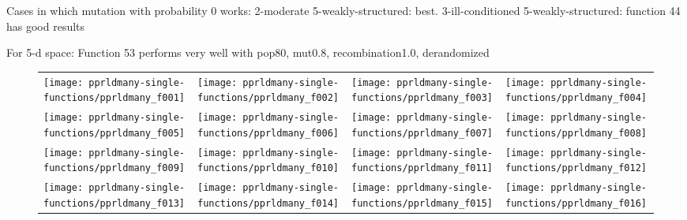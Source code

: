 \documentclass{sig-alternate}
\begin{document}
Cases in which mutation with probability 0 works:
2-moderate 5-weakly-structured:  best.
3-ill-conditioned 5-weakly-structured: function 44 has good results

For 5-d space:
Function 53 performs very well with pop80, mut0.8, recombination1.0, derandomized


\begin{figure*}
\centering
\begin{tabular}{@{\hspace*{-0.018\textwidth}}l@{\hspace*{-0.02\textwidth}}l@{\hspace*{-0.02\textwidth}}l@{\hspace*{-0.02\textwidth}}l@{\hspace*{-0.02\textwidth}}}
\texttt{[image: pprldmany-single-functions/pprldmany\_f001]}&
\texttt{[image: pprldmany-single-functions/pprldmany\_f002]}&
\texttt{[image: pprldmany-single-functions/pprldmany\_f003]}&
\texttt{[image: pprldmany-single-functions/pprldmany\_f004]}\\[-1.8ex]
\texttt{[image: pprldmany-single-functions/pprldmany\_f005]}&
\texttt{[image: pprldmany-single-functions/pprldmany\_f006]}&
\texttt{[image: pprldmany-single-functions/pprldmany\_f007]}&
\texttt{[image: pprldmany-single-functions/pprldmany\_f008]}\\[-1.8ex]
\texttt{[image: pprldmany-single-functions/pprldmany\_f009]}&
\texttt{[image: pprldmany-single-functions/pprldmany\_f010]}&
\texttt{[image: pprldmany-single-functions/pprldmany\_f011]}&
\texttt{[image: pprldmany-single-functions/pprldmany\_f012]}\\[-1.8ex]
\texttt{[image: pprldmany-single-functions/pprldmany\_f013]}&
\texttt{[image: pprldmany-single-functions/pprldmany\_f014]}&
\texttt{[image: pprldmany-single-functions/pprldmany\_f015]}&
\texttt{[image: pprldmany-single-functions/pprldmany\_f016]}\\[-1.8ex]
\end{tabular}
 \caption{\label{fig:ECDFsingleOne}
 \bbobecdfcaptionsinglefcts{}
}

\end{figure*}
\end{document}
